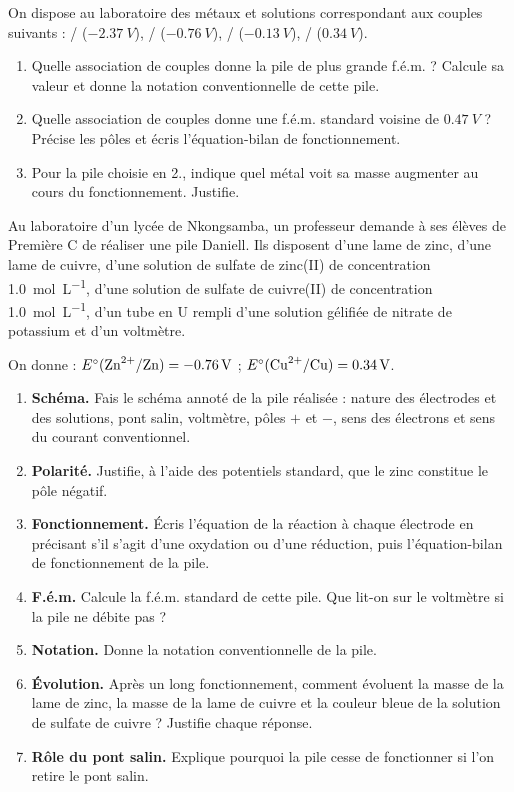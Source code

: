\documentclass[11pt]{article}
\newcounter{popsec}
\newcounter{popsub}
\newcommand{\courssub}[1]{%
  \stepcounter{popsub}%
  \par\vspace{9pt}\noindent{\popxbold\fontsize{11.5}{13}\selectfont\color{popink}{\color{poporange}\thepopsec.\thepopsub}\hspace{6pt}#1}\par\nopagebreak\vspace{4pt}
}
\begin{document}
\begin{exercice}
On dispose au laboratoire des métaux et solutions correspondant aux couples suivants : / ($\SI{-2,37}{V}$), / ($\SI{-0,76}{V}$), / ($\SI{-0,13}{V}$), / ($\SI{+0,34}{V}$).
\begin{enumerate}
\item Quelle association de couples donne la pile de plus grande f.é.m. ? Calcule sa valeur et donne la notation conventionnelle de cette pile.
\item Quelle association de couples donne une f.é.m. standard voisine de $\SI{0,47}{V}$ ? Précise les pôles et écris l'équation-bilan de fonctionnement.
\item Pour la pile choisie en 2., indique quel métal voit sa masse augmenter au cours du fonctionnement. Justifie.
\end{enumerate}
\end{exercice}

\courssub{Je me prépare au Probatoire}

\begin{exercice}
Au laboratoire d'un lycée de Nkongsamba, un professeur demande à ses élèves de Première C de réaliser une pile Daniell. Ils disposent d'une lame de zinc, d'une lame de cuivre, d'une solution de sulfate de zinc(II) de concentration \SI{1,0}{mol.L^{-1}}, d'une solution de sulfate de cuivre(II) de concentration \SI{1,0}{mol.L^{-1}}, d'un tube en U rempli d'une solution gélifiée de nitrate de potassium et d'un voltmètre.

On donne : $E^{\circ}(\ce{Zn^2+}/\ce{Zn}) = \SI{-0,76}{V}$ ; $E^{\circ}(\ce{Cu^2+}/\ce{Cu}) = \SI{+0,34}{V}$.
\begin{enumerate}
\item \textbf{Schéma.} Fais le schéma annoté de la pile réalisée : nature des électrodes et des solutions, pont salin, voltmètre, pôles $+$ et $-$, sens des électrons et sens du courant conventionnel.
\item \textbf{Polarité.} Justifie, à l'aide des potentiels standard, que le zinc constitue le pôle négatif.
\item \textbf{Fonctionnement.} Écris l'équation de la réaction à chaque électrode en précisant s'il s'agit d'une oxydation ou d'une réduction, puis l'équation-bilan de fonctionnement de la pile.
\item \textbf{F.é.m.} Calcule la f.é.m. standard de cette pile. Que lit-on sur le voltmètre si la pile ne débite pas ?
\item \textbf{Notation.} Donne la notation conventionnelle de la pile.
\item \textbf{Évolution.} Après un long fonctionnement, comment évoluent la masse de la lame de zinc, la masse de la lame de cuivre et la couleur bleue de la solution de sulfate de cuivre ? Justifie chaque réponse.
\item \textbf{Rôle du pont salin.} Explique pourquoi la pile cesse de fonctionner si l'on retire le pont salin.
\end{enumerate}
\end{exercice}
\end{document}
